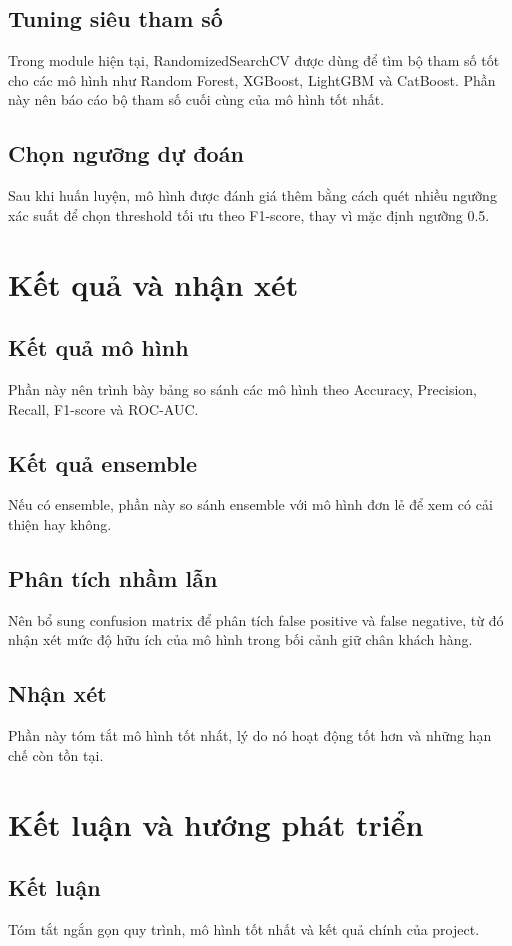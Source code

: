 \documentclass[conference]{IEEEtran}
\begin{document}
\subsection{Tuning siêu tham số}
Trong module hiện tại, RandomizedSearchCV được dùng để tìm bộ tham số tốt cho các mô hình như Random Forest, XGBoost, LightGBM và CatBoost. Phần này nên báo cáo bộ tham số cuối cùng của mô hình tốt nhất.

\subsection{Chọn ngưỡng dự đoán}
Sau khi huấn luyện, mô hình được đánh giá thêm bằng cách quét nhiều ngưỡng xác suất để chọn threshold tối ưu theo F1-score, thay vì mặc định ngưỡng 0.5.

\section{Kết quả và nhận xét}
\subsection{Kết quả mô hình}
Phần này nên trình bày bảng so sánh các mô hình theo Accuracy, Precision, Recall, F1-score và ROC-AUC.

\subsection{Kết quả ensemble}
Nếu có ensemble, phần này so sánh ensemble với mô hình đơn lẻ để xem có cải thiện hay không.

\subsection{Phân tích nhầm lẫn}
Nên bổ sung confusion matrix để phân tích false positive và false negative, từ đó nhận xét mức độ hữu ích của mô hình trong bối cảnh giữ chân khách hàng.

\subsection{Nhận xét}
Phần này tóm tắt mô hình tốt nhất, lý do nó hoạt động tốt hơn và những hạn chế còn tồn tại.

\section{Kết luận và hướng phát triển}
\subsection{Kết luận}
Tóm tắt ngắn gọn quy trình, mô hình tốt nhất và kết quả chính của project.
\end{document}
